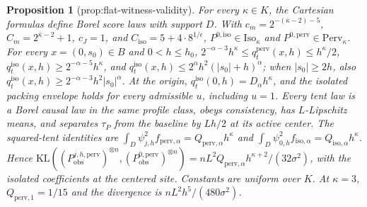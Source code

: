 \documentclass{article}
\newtheorem{proposition}{Proposition}
\begin{document}
\begin{proposition}[prop:flat-witness-validity]\label{prop:flat-witness-validity}
For every \(\kappa\in K\), the Cartesian formulas define Borel score laws with support \(D\). With \(c_m=2^{-(\bar\kappa-2)-5}\), \(C_m=2^{\bar\kappa-2}+1\), \(c_J=1\), and \(C_{\mathrm{iso}}=5+4\cdot8^{1/\epsilon}\), \(P^{0,\mathrm{iso}}\in\mathrm{Iso}_\kappa\) and \(P^{0,\mathrm{perv}}\in\mathrm{Perv}_\kappa\). For every \(x=(0,s_0)\in B\) and \(0<h\leq h_0\), \(2^{-\alpha-3}h^\kappa\leq q_t^{\mathrm{perv}}(x,h)\leq h^\kappa/2\), \(q_t^{\mathrm{iso}}(x,h)\geq2^{-\alpha-5}h^\kappa\), and \(q_t^{\mathrm{iso}}(x,h)\leq2^\alpha h^2(|s_0|+h)^\alpha\); when \(|s_0|\geq2h\), also \(q_t^{\mathrm{iso}}(x,h)\geq2^{-\alpha-3}h^2|s_0|^\alpha\). At the origin, \(q_t^{\mathrm{iso}}(0,h)=D_\alpha h^\kappa\), and the isolated packing envelope holds for every admissible \(u\), including \(u=1\). Every tent law is a Borel causal law in the same profile class, obeys consistency, has \(L\)-Lipschitz means, and separates \(\tau_P\) from the baseline by \(Lh/2\) at its active center. The squared-tent identities are \(\int_D\psi_{j,h}^2f_{\mathrm{perv},\alpha}=Q_{\mathrm{perv},\alpha}h^\kappa\) and \(\int_D\psi_{0,h}^2f_{\mathrm{iso},\alpha}=Q_{\mathrm{iso},\alpha}h^\kappa\). Hence \(\mathrm{KL}((P^{j,h,\mathrm{perv}}_{\mathrm{obs}})^{\otimes n},(P^{0,\mathrm{perv}}_{\mathrm{obs}})^{\otimes n})=nL^2Q_{\mathrm{perv},\alpha}h^{\kappa+2}/(32\sigma^2)\), with the isolated coefficients at the centered site. Constants are uniform over \(K\). At \(\kappa=3\), \(Q_{\mathrm{perv},1}=1/15\) and the divergence is \(nL^2h^5/(480\sigma^2)\).
\end{proposition}
\end{document}
